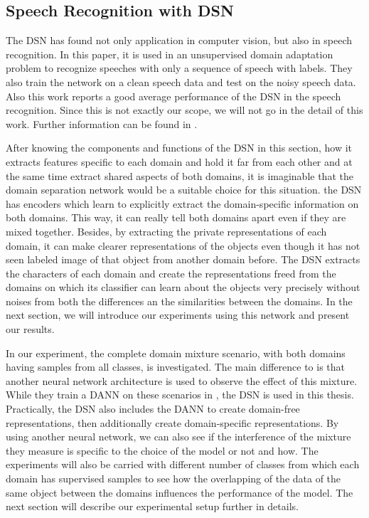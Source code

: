 \subsection*{Speech Recognition with DSN \cite{dsnspeech}} 
The DSN has found not only application in computer vision, but also in speech recognition. In this paper, it is used in an unsupervised domain adaptation problem to recognize speeches with only a sequence of speech with labels. They also train the network on a clean speech data and test on the noisy speech data. Also this work reports a good average performance of the DSN in the speech recognition. Since this is not exactly our scope, we will not go in the detail of this work. Further information can be found in \cite{dsnspeech}. 

After knowing the components and functions of the DSN in this section, how it extracts features specific to each domain and hold it far from each other and at the same time extract shared aspects of both domains, it is imaginable that the domain separation network would be a suitable choice for this situation.  the DSN has encoders which learn to explicitly extract the domain-specific information on both domains. This way, it can really tell both domains apart even if they are mixed together. Besides, by extracting the private representations of each domain, it can make clearer representations of the objects even though it has not seen labeled image of that object from another domain before. The DSN extracts the characters of each domain and create the representations freed from the domains on which its classifier can learn about the objects very precisely without noises from both the differences an the similarities between the domains. In the next section, we will introduce our experiments using this network and present our results.

In our experiment, the complete domain mixture scenario, with both domains having samples from all classes, is investigated. The main difference to \cite{domainMixture} is that another neural network architecture is used to observe the effect of this mixture. While they train a DANN on these scenarios in \cite{domainMixture}, the DSN is used in this thesis. Practically, the DSN also includes the DANN to create domain-free representations, then additionally create domain-specific representations. By using another neural network, we can also see if the interference of the mixture they measure is specific to the choice of the model or not and how. The experiments will also be carried with different number of classes from which each domain has supervised samples to see how the overlapping of the data of the same object between the domains influences the performance of the model. The next section will describe our experimental setup further in details.